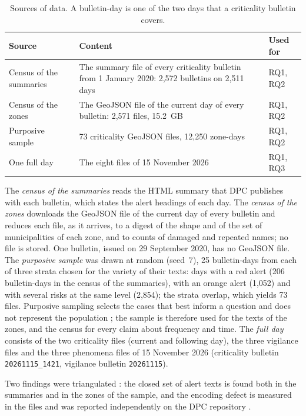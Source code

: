 \documentclass[review,authoryear,12pt]{elsarticle}
\newcommand{\field}[1]{\texttt{#1}}
\begin{document}
\begin{table}[t]
\centering
\caption{Sources of data. A bulletin-day is one of the two days that a
criticality bulletin covers.}
\label{tab:sources}
\small
\begin{tabularx}{\linewidth}{@{}lXl@{}}
\toprule
Source & Content & Used for \\
\midrule
Census of the summaries & The summary file of every criticality bulletin
from 1 January 2020: 2,572 bulletins on 2,511 days & RQ1, RQ2 \\
Census of the zones & The GeoJSON file of the current day of every bulletin:
2,571 files, 15.2~GB & RQ1, RQ2 \\
Purposive sample & 73 criticality GeoJSON files, 12,250 zone-days & RQ1, RQ2 \\
One full day & The eight files of 15 November 2026 & RQ1, RQ3 \\
\bottomrule
\end{tabularx}
\end{table}

The \emph{census of the summaries} reads the HTML summary that DPC publishes
with each bulletin, which states the alert headings of each day. The
\emph{census of the zones} downloads the GeoJSON file of the current day of
every bulletin and reduces each file, as it arrives, to a digest of the shape
and of the set of municipalities of each zone, and to counts of damaged and
repeated names; no file is stored. One bulletin, issued on 29 September 2020,
has no GeoJSON file. The \emph{purposive sample} was drawn at random (seed~7),
25 bulletin-days from each of three strata chosen for the variety of their
texts: days with a red alert (206 bulletin-days in the census of the
summaries), with an orange alert (1,052) and with several risks at the same
level (2,854); the strata overlap, which yields 73 files. Purposive sampling
selects the cases that best inform a question and does not represent the
population \citep{etikan2016}; the sample is therefore used for the texts of
the zones, and the census for every claim about frequency and time. The
\emph{full day} consists of the two criticality files (current and following
day), the three vigilance files and the three phenomena files of 15 November
2026 (criticality bulletin \field{20261115\_1421}, vigilance bulletin
\field{20261115}).

Two findings were triangulated \citep{denzin1978}: the closed set of alert
texts is found both in the summaries and in the zones of the sample, and the
encoding defect is measured in the files and was reported independently on the
DPC repository \citep{dpc2024issue10}.
\end{document}
